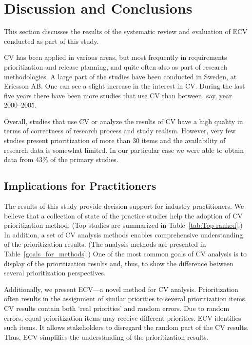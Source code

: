 
\section{Discussion and Conclusions\label{discussion}}
This section discusses the results of the systematic review and evaluation of ECV conducted as part of this study.

CV has been applied in various areas, but most frequently in requirements prioritization and release planning, and quite often also as part of research methodologies.
A large part of the studies have been conducted in Sweden, at Ericsson AB.%
One can see a slight increase in the interest in CV. During the last five years there have been more studies that use CV than between, say, year 2000--2005.

Overall, studies that use CV or analyze the results of CV have a high quality in terms of correctness of research process and study realism.
However, very few studies present prioritization of more than 30 items and the availability of research data is somewhat limited. In our particular case we were able to obtain data from 43\% of the primary studies.

\subsection{Implications for Practitioners}
The results of this study provide decision support for industry practitioners.
We believe that a collection of state of the practice studies help the adoption of CV prioritization method. (Top studies are summarized in Table~\ref{tab:Top-ranked}.)
In addition, a set of CV analysis methods enables comprehensive understanding of the prioritization results. 
(The analysis methods are presented in Table~\ref{goals_for_methods}.)
One of the most common goals of CV analysis is to display of the prioritization results and, thus, to show the difference between several prioritization perspectives.

Additionally, we present ECV---a novel method for CV analysis.
Prioritization often results in the assignment of similar priorities to several prioritization items.
CV results contain both `real priorities' and random errors.
Due to random errors, equal prioritization items may receive different priorities.
ECV identifies such items. It allows stakeholders to disregard the random part of the CV results.
Thus, ECV simplifies the understanding of the prioritization results.

